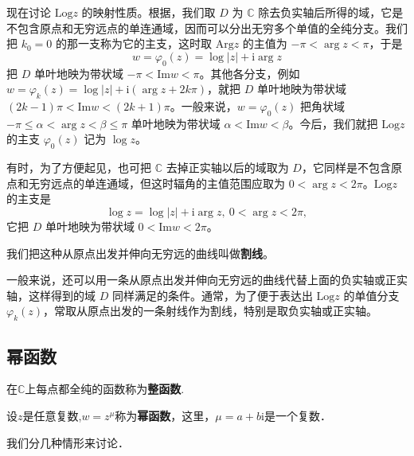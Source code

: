 \documentclass[../../main.tex]{subfiles}
\begin{document}
现在讨论 \( \mathrm{Log} z \) 的映射性质。根据，我们取 \( D \) 为 \( \mathbb{C} \) 除去负实轴后所得的域，它是不包含原点和无穷远点的单连通域，因而可以分出无穷多个单值的全纯分支。我们把 \( k_0 = 0 \) 的那一支称为它的主支，这时取 \( \mathrm{Arg} z \) 的主值为 \( -\pi < \arg z < \pi \)，于是
\[
w = \varphi_0(z) = \log|z| + \mathrm{i}\arg z
\]
把 \( D \) 单叶地映为带状域 \( -\pi < \mathrm{Im} w < \pi \)。其他各分支，例如 \( w = \varphi_k(z)=\log|z| + \mathrm{i}(\arg z + 2k\pi) \)，就把 \( D \) 单叶地映为带状域 \( (2k - 1)\pi < \mathrm{Im} w < (2k + 1)\pi \)。一般来说，\( w = \varphi_0(z) \) 把角状域 \( -\pi \leqslant \alpha < \arg z < \beta \leqslant \pi \) 单叶地映为带状域 \( \alpha < \mathrm{Im} w < \beta \)。今后，我们就把 \( \mathrm{Log} z \) 的主支 \( \varphi_0(z) \) 记为 \( \log z \)。

有时，为了方便起见，也可把 \( \mathbb{C} \) 去掉正实轴以后的域取为 \( D \)，它同样是不包含原点和无穷远点的单连通域，但这时辐角的主值范围应取为 \( 0 < \arg z < 2\pi \)。\( \mathrm{Log} z \) 的主支是
\[
\log z = \log|z| + \mathrm{i}\arg z, \ 0 < \arg z < 2\pi,
\]
它把 \( D \) 单叶地映为带状域 \( 0 < \mathrm{Im} w < 2\pi \)。

\begin{definition}[割线]
我们把这种从原点出发并伸向无穷远的曲线叫做\textbf{割线}。
\end{definition}

一般来说，还可以用一条从原点出发并伸向无穷远的曲线代替上面的负实轴或正实轴，这样得到的域 \( D \) 同样满足的条件。通常，为了便于表达出 \( \mathrm{Log} z \) 的单值分支 \( \varphi_k(z) \)，常取从原点出发的一条射线作为割线，特别是取负实轴或正实轴。



\subsection{幂函数}

\begin{definition}[整函数]
在$\mathbb{C}$上每点都全纯的函数称为\textbf{整函数}.
\end{definition}

\begin{definition}[幂函数]
设$z$是任意复数,$w = z^{\mu}$称为\textbf{幂函数}，这里，$\mu = a + b\text{i}$是一个复数．
\end{definition}
我们分几种情形来讨论．
\end{document}
